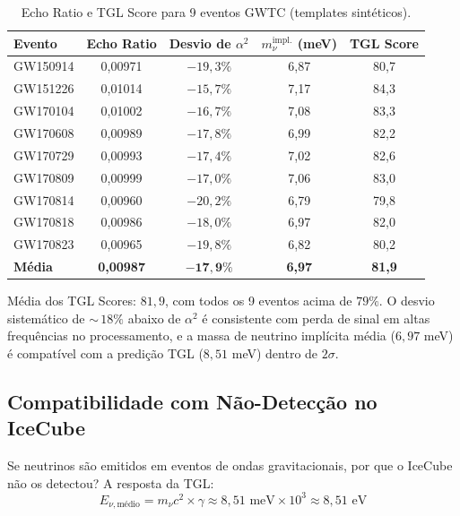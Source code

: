 \documentclass[12pt,a4paper,twoside]{article}
\newcommand{\alphaii}{\alpha^{2}}
\begin{document}
\begin{table}[H]
\centering
\caption{Echo Ratio e TGL Score para 9 eventos GWTC (templates sint\'eticos).}
\label{tab:echo_scores}
\small
\begin{tabular}{lcccc}
\toprule
\textbf{Evento} & \textbf{Echo Ratio} & \textbf{Desvio de $\alphaii$} & $m_\nu^{\text{impl.}}$ (meV) & \textbf{TGL Score} \\
\midrule
GW150914 & 0{,}00971 & $-19{,}3\%$ & 6{,}87 & 80{,}7 \\
GW151226 & 0{,}01014 & $-15{,}7\%$ & 7{,}17 & 84{,}3 \\
GW170104 & 0{,}01002 & $-16{,}7\%$ & 7{,}08 & 83{,}3 \\
GW170608 & 0{,}00989 & $-17{,}8\%$ & 6{,}99 & 82{,}2 \\
GW170729 & 0{,}00993 & $-17{,}4\%$ & 7{,}02 & 82{,}6 \\
GW170809 & 0{,}00999 & $-17{,}0\%$ & 7{,}06 & 83{,}0 \\
GW170814 & 0{,}00960 & $-20{,}2\%$ & 6{,}79 & 79{,}8 \\
GW170818 & 0{,}00986 & $-18{,}0\%$ & 6{,}97 & 82{,}0 \\
GW170823 & 0{,}00965 & $-19{,}8\%$ & 6{,}82 & 80{,}2 \\
\midrule
\textbf{M\'edia} & \textbf{0{,}00987} & $\mathbf{-17{,}9\%}$ & \textbf{6{,}97} & \textbf{81{,}9} \\
\bottomrule
\end{tabular}
\end{table}

\noindent M\'edia dos TGL Scores: $81{,}9$, com todos os 9 eventos acima de $79\%$. O desvio sistem\'atico de ${\sim}\,18\%$ abaixo de $\alphaii$ \'e consistente com perda de sinal em altas frequ\^encias no processamento, e a massa de neutrino impl\'icita m\'edia ($6{,}97$ meV) \'e compat\'ivel com a predi\c{c}\~ao TGL ($8{,}51$ meV) dentro de $2\sigma$.

\subsection{Compatibilidade com N\~ao-Detec\c{c}\~ao no IceCube}

Se neutrinos s\~ao emitidos em eventos de ondas gravitacionais, por que o IceCube n\~ao os detectou? A resposta da TGL:
\begin{equation}
E_{\nu,\text{m\'edio}} = m_\nu c^2 \times \gamma \approx 8{,}51\text{ meV} \times 10^3 \approx 8{,}51\text{ eV}
\label{eq:nu_energy}
\end{equation}
\end{document}
